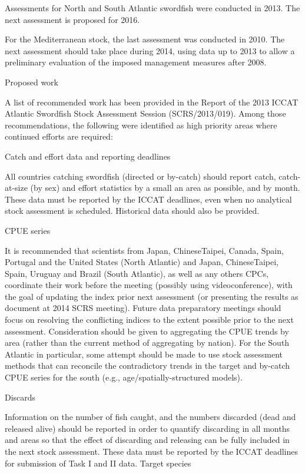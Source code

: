 \documentclass[a4paper,10pt]{article}
\begin{document}
Assessments for North and South Atlantic swordfish were conducted in 2013. The next assessment is proposed for 2016. 

For the Mediterranean stock, the last assessment was conducted in 2010. The next assessment should take place during 2014, using data up to 2013 to allow a preliminary evaluation of the imposed management measures after 2008.

Proposed work

A list of recommended work has been provided in the Report of the 2013 ICCAT Atlantic Swordfish Stock Assessment Session (SCRS/2013/019). Among those recommendations, the following were identified as high priority areas where continued efforts are required:

Catch and effort data and reporting deadlines

All countries catching swordfish (directed or by-catch) should report catch, catch-at-size (by sex) and effort statistics by a small an area as possible, and by month. These data must be reported by the ICCAT deadlines, even when no analytical stock assessment is scheduled. Historical data should also be provided.

CPUE series

It is recommended that scientists from Japan, ChineseTaipei, Canada, Spain, Portugal and the United States (North Atlantic) and Japan, ChineseTaipei, Spain, Uruguay and Brazil (South Atlantic), as well as any others CPCs, coordinate their work before the meeting (possibly using videoconference), with the goal of updating the index prior next assessment (or presenting the results as document at 2014 SCRS meeting). Future data preparatory meetings should focus on resolving the conflicting indices to the extent possible prior to the next assessment. Consideration should be given to aggregating the CPUE trends by area (rather than the current method of aggregating by nation). For the South Atlantic in particular, some attempt should be made to use stock assessment methods that can reconcile the contradictory trends in the target and by-catch CPUE series for the south (e.g., age/spatially-structured models).

Discards

Information on the number of fish caught, and the numbers discarded (dead and released alive) should be reported in order to quantify discarding in all months and areas so that the effect of discarding and releasing can be fully included in the next stock assessment. These data must be reported by the ICCAT deadlines for submission of Task I and II data.
Target species
\end{document}
